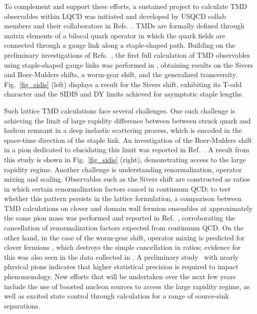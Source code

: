 To complement and support these efforts, a sustained
project to calculate TMD observables within LQCD was initiated
and developed by USQCD collab members and their collaborators in Refs.~\cite{Hagler:2009mb,Musch:2010ka,Musch:2011er,Engelhardt:2015xja,Yoon:2017qzo,Engelhardt:2017miy}.
TMDs are formally defined through matrix elements of a bilocal quark
operator in which the quark fields are connected through a gauge link
along a staple-shaped path. Building on the preliminary investigations of Refs.~\cite{Hagler:2009mb,Musch:2010ka}, the first full calculation of TMD
observables using staple-shaped gauge links was performed in
\cite{Musch:2011er}, obtaining results on the Sivers and Boer-Mulders
shifts, a worm-gear shift, and the generalized transversity.
Fig.~\ref{fig_sidis} (left) displays a  result for the Sivers
shift, exhibiting its T-odd character and the SIDIS and DY limits
achieved for asymptotic staple lengths.

Such lattice TMD calculations face several challenges. One such challenge is achieving
the  limit of large rapidity difference between between struck
quark and hadron remnant in a deep inelastic scattering process, which
is encoded in the space-time direction of the staple link. An investigation
of the Boer-Mulders shift in a pion dedicated to elucidating this limit
was reported in Ref.~\cite{Engelhardt:2015xja}. A result from this study is
shown in Fig.~\ref{fig_sidis} (right), demonstrating access to the large
rapidity regime. Another challenge is understanding renormalization,
operator mixing and scaling. Observables such as the Sivers shift are
constructed as ratios in which certain renormalization factors cancel
in continuum QCD; to test whether this pattern persists in the lattice
formulation, a comparison between TMD calculations on clover and domain
wall fermion ensembles at approximately the same pion mass was performed
and reported in Ref.~\cite{Yoon:2017qzo}, corroborating the cancellation of 
renormalization factors expected from continuum QCD.
On the other hand,
in the case of the worm-gear shift, operator mixing is predicted for
clover fermions \cite{Constantinou:2017sej}, which destroys the simple
cancellation in ratios; evidence for this was also seen in the data
collected in \cite{Yoon:2017qzo}.
A preliminary study~\cite{Engelhardt:2015czw} with nearly physical
pions indicates that higher statistical precision is required to impact phenomenology. New efforts
that will be undertaken over the next few years include the use of boosted nucleon sources to access the large
rapidity regime, as well as excited state control through calculation
for a range of source-sink separations.

